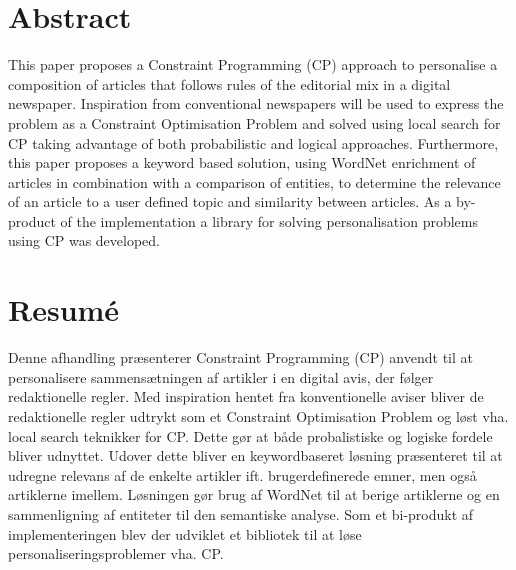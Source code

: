 \begingroup
\let\clearpage\relax
\let\cleardoublepage\relax
\let\cleardoublepage\relax

\chapter*{Abstract}
This paper proposes a Constraint Programming (CP) approach to personalise a composition of articles that follows rules of the editorial mix in a digital newspaper. Inspiration from conventional newspapers will be used to express the problem as a Constraint Optimisation Problem and solved using local search for CP taking advantage of both probabilistic and logical approaches. Furthermore, this paper proposes a keyword based solution, using WordNet enrichment of articles in combination with a comparison of entities, to determine the relevance of an article to a user defined topic and similarity between articles. As a by-product of the implementation a library for solving personalisation problems using CP was developed.

\vfill

\chapter*{Resumé}
Denne afhandling præsenterer Constraint Programming (CP) anvendt til at personalisere sammensætningen af artikler i en digital avis, der følger redaktionelle regler. Med inspiration hentet fra konventionelle aviser bliver de redaktionelle regler udtrykt som et Constraint Optimisation Problem og løst vha. local search teknikker for CP. Dette gør at både probalistiske og logiske fordele bliver udnyttet. Udover dette bliver en keywordbaseret løsning præsenteret til at udregne relevans af de enkelte artikler ift. brugerdefinerede emner, men også artiklerne imellem. Løsningen gør brug af WordNet til at berige artiklerne og en sammenligning af entiteter til den semantiske analyse. Som et bi-produkt af implementeringen blev der udviklet et bibliotek til at løse personaliseringsproblemer vha. CP.


\endgroup			

\vfill

%
%
%
%

\vfill
